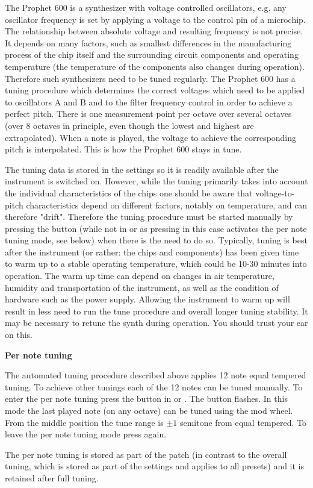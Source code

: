 The Prophet 600 is a synthesizer with voltage controlled oscillators, e.g. any oscillator frequency is set by applying a voltage to the control pin of a microchip. The relationship between absolute voltage and resulting frequency is not precise. It depends on many factors, such as smallest differences in the manufacturing process of the chip itself and the surrounding circuit components and operating temperature (the temperature of the components also changes during operation). Therefore such synthesizers need to be tuned regularly.  The Prophet 600 has a tuning procedure which determines the correct voltages which need to be applied to oscillators A and B and to the filter frequency control in order to achieve a perfect pitch. There is one measurement point per octave over several octaves (over 8 octaves in principle, even though the lowest and highest are extrapolated). When a note is played, the voltage to achieve the corresponding pitch is interpolated. This is how the Prophet 600 stays in tune. 

The tuning data is stored in the settings so it is readily available after the instrument is switched on. However, while the tuning primarily takes into account the individual characteristics of the chips one should be aware that voltage-to-pitch characteristics depend on different factors, notably on temperature, and can therefore "drift". Therefore the tuning procedure must be started manually by pressing the \tune button (while not in \shiftmode or \shiftlock as pressing \tune in this case activates the per note tuning mode, see below) when there is the need to do so. Typically, tuning is best after the instrument (or rather: the chips and components) has been given time to warm up to a stable operating temperature, which could be 10-30 minutes into operation. The warm up time can depend on changes in air temperature, humidity and transportation of the instrument, as well as the condition of hardware such as the power supply.  Allowing the instrument to warm up will result in less need to run the tune procedure and overall longer tuning stability. It may be necessary to retune the synth during operation. You should trust your ear on this.

\textbf{Per note tuning}

The automated tuning procedure described above applies 12 note equal tempered tuning. To achieve other tunings each of the 12 notes can be tuned manually. To enter the per note tuning press the \tune button in \shiftmode or \shiftlock. The \tune button flashes. In this mode the last played note (on any octave) can be tuned using the mod wheel. From the middle position the tune range is $\pm 1$ semitone from equal tempered. To leave the per note tuning mode press \tune again.

The per note tuning is stored as part of the patch (in contrast to the overall tuning, which is stored as part of the settings and applies to all presets) and it is retained after full tuning.
